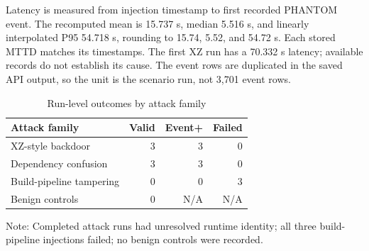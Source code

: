 \documentclass[conference]{IEEEtran}
\begin{document}
Latency is measured from injection timestamp to first recorded PHANTOM event. The recomputed mean is 15.737 s, median 5.516 s, and linearly interpolated P95 54.718 s, rounding to 15.74, 5.52, and 54.72 s. Each stored MTTD matches its timestamps. The first XZ run has a 70.332 s latency; available records do not establish its cause. The event rows are duplicated in the saved API output, so the unit is the scenario run, not 3,701 event rows.

\begin{table}[!t]\caption{Run-level outcomes by attack family}\label{tab:scenario-cm}\centering\scriptsize
\begin{tabularx}{\columnwidth}{>{\raggedright\arraybackslash}Xrrr}\toprule
Attack family & Valid & Event+ & Failed\\\midrule
XZ-style backdoor & 3 & 3 & 0\\
Dependency confusion & 3 & 3 & 0\\
Build-pipeline tampering & 0 & 0 & 3\\
Benign controls & 0 & N/A & N/A\\\bottomrule
\end{tabularx}
\par\vspace{1pt}\footnotesize Note: Completed attack runs had unresolved runtime identity; all three build-pipeline injections failed; no benign controls were recorded.
\end{table}
\end{document}
